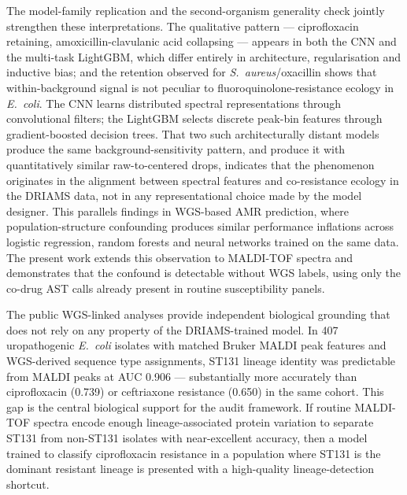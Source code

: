 \documentclass[11pt]{article}
\begin{document}
The model-family replication and the second-organism generality check jointly strengthen these interpretations. The qualitative pattern --- ciprofloxacin retaining, amoxicillin-clavulanic acid collapsing --- appears in both the CNN and the multi-task LightGBM, which differ entirely in architecture, regularisation and inductive bias; and the retention observed for \textit{S.~aureus}/oxacillin shows that within-background signal is not peculiar to fluoroquinolone-resistance ecology in \textit{E.~coli}. The CNN learns distributed spectral representations through convolutional filters; the LightGBM selects discrete peak-bin features through gradient-boosted decision trees. That two such architecturally distant models produce the same background-sensitivity pattern, and produce it with quantitatively similar raw-to-centered drops, indicates that the phenomenon originates in the alignment between spectral features and co-resistance ecology in the DRIAMS data, not in any representational choice made by the model designer. This parallels findings in WGS-based AMR prediction, where population-structure confounding produces similar performance inflations across logistic regression, random forests and neural networks trained on the same data\cite{yu2025population}. The present work extends this observation to MALDI-TOF spectra and demonstrates that the confound is detectable without WGS labels, using only the co-drug AST calls already present in routine susceptibility panels.

The public WGS-linked analyses provide independent biological grounding that does not rely on any property of the DRIAMS-trained model. In 407 uropathogenic \textit{E.~coli} isolates with matched Bruker MALDI peak features and WGS-derived sequence type assignments, ST131 lineage identity was predictable from MALDI peaks at AUC 0.906 --- substantially more accurately than ciprofloxacin (0.739) or ceftriaxone resistance (0.650) in the same cohort. This gap is the central biological support for the audit framework. If routine MALDI-TOF spectra encode enough lineage-associated protein variation to separate ST131 from non-ST131 isolates with near-excellent accuracy, then a model trained to classify ciprofloxacin resistance in a population where ST131 is the dominant resistant lineage is presented with a high-quality lineage-detection shortcut.
\end{document}
